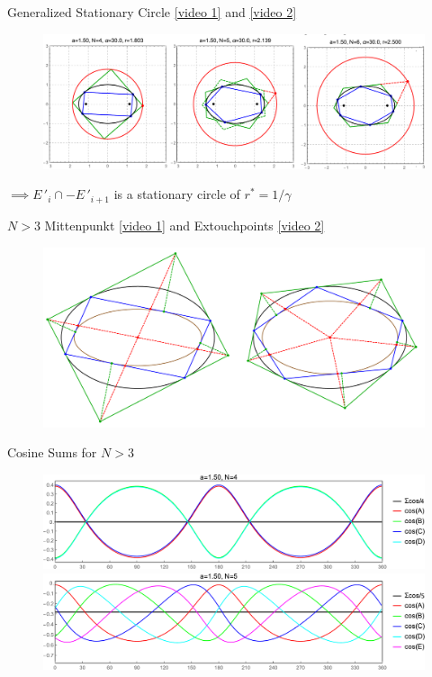 \begin{frame}{Generalized Stationary Circle     \href{https://youtu.be/dINE4aH1cvk}{[video 1]} and \href{https://youtu.be/EFeINGIDFrg}{[video 2]}}
\begin{figure}
    \includegraphics[clip,trim={0 0 0 1.66cm},width=\textwidth]{pics/0180_circ_grid_v3.pdf}
\end{figure}
\vspace*{-.125cm}
$\implies E\,'_{i}\cap-E\,'_{i+1}$ is a stationary circle of  $r^*=1/\gamma$
\end{frame}

\begin{frame}{$N>3$ Mittenpunkt \href{https://youtu.be/TV2p7fPlYfE}{[video 1]} and Extouchpoints \href{https://youtu.be/Bpc-MrR2IMc}{[video 2]}}
\begin{figure}
    \includegraphics[width=\textwidth]{pics/0165_extouch.pdf}
    \label{fig:gen-mitten}
\end{figure}
\end{frame}

\begin{frame}{Cosine Sums for $N>3$}
\begin{figure}
\includegraphics[width=.9\textwidth]{pics/0091_cosine_sum_n4.pdf}\\
\includegraphics[width=.9\textwidth]{pics/0092_cosine_sum_n5.pdf}
\end{figure}
\end{frame}

